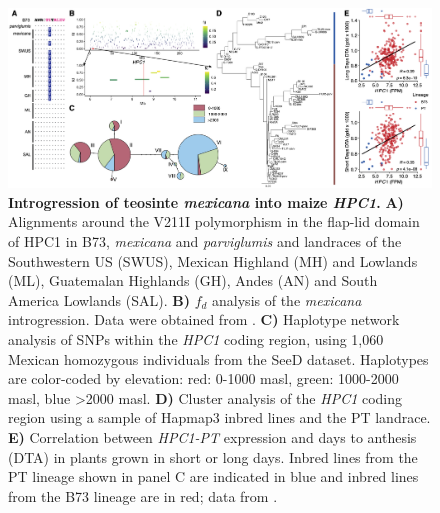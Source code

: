 \documentclass[9pt,twocolumn,twoside,lineno]{biorxiv}
\begin{document}
\begin{figure}[!ht]
\begin{center}
\includegraphics[width=0.8\paperwidth]{Figures/Fig_6.png}
\caption{\textbf{Introgression of teosinte \textit{mexicana} into maize \textit{HPC1}.}  
\textbf{A)} Alignments around the V211I polymorphism in the flap-lid domain of HPC1 in B73, \textit{mexicana} and \textit{parviglumis} and landraces of the Southwestern US (SWUS), Mexican Highland (MH) and Lowlands (ML), Guatemalan Highlands (GH), Andes (AN) and South America Lowlands (SAL).
\textbf{B)} \(f_d\) analysis of the \textit{mexicana} introgression. Data were obtained from \cite{Gonzalez-Segovia2019-jy}. 
\textbf{C)} Haplotype network analysis of SNPs within the \textit{HPC1} coding region, using 1,060 Mexican homozygous individuals from the SeeD dataset. Haplotypes are color-coded by elevation: red: 0-1000 masl, green: 1000-2000 masl, blue >2000 masl.
\textbf{D)} Cluster analysis of the \textit{HPC1} coding region using a sample of Hapmap3 inbred lines and the PT landrace.
\textbf{E)} Correlation between \textit{HPC1-PT} expression and days to anthesis (DTA) in plants grown in short or long days. 
Inbred lines from the PT lineage shown in panel C are indicated in blue and inbred lines from the B73 lineage are in red;
data from \cite{Kremling2018-gn}.}
\label{Fig6}
\end{center}
\end{figure}
 
\end{document}
